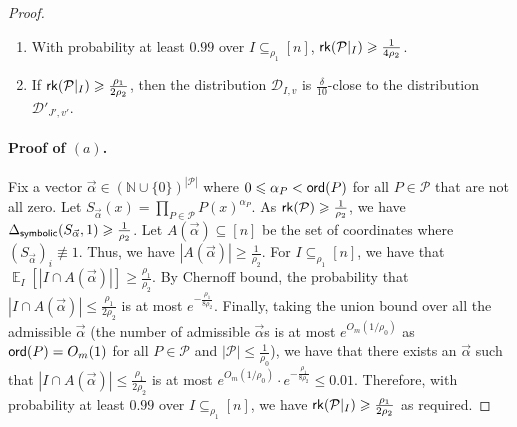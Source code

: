\documentclass[10pt,a4paper]{amsart}
\newcommand\Expect[2]{{\mathop{\mathbb{E}}_{#1}\left[ {#2} \right]}}
\renewcommand\geq{\geqslant}
\renewcommand\leq{\leqslant}
\begin{document}
\begin{proof}
\begin{enumerate}
    \item[(a)] With probability at least $0.99$ over $I\subseteq_{\rho_1} [n]$, ${\sf rk}(\mathcal{P}|_{I})\geq \frac{1}{4\rho_2}$.
    \item[(b)] If ${\sf rk}(\mathcal{P}|_{{I}})\geq \frac{\rho_1}{2\rho_2}$, then the distribution $\mathcal{D}_{I, v}$ is $\frac{\delta}{10}$-close to the distribution $\mathcal{D}'_{J', v'}$.
\end{enumerate}

\paragraph{Proof of $(a)$.} Fix a vector $\vec{\alpha}\in (\mathbb{N} \cup \{0\})^{|\mathcal{P}|}$ where $0\leq \alpha_P <{\sf ord}(P)$ for all $P\in \mathcal{P}$ that are not all zero. Let $S_{\vec{\alpha}}(x) = \prod_{P\in \mathcal{P}} P(x)^{\alpha_P}$. As ${\sf rk}(\mathcal{P}) \geq \frac{1}{\rho_2}$, we have $\Delta_{{\sf symbolic}}(S_{\vec{\alpha}},1)\geq \frac{1}{\rho_2}$. Let $A({\vec{\alpha}}) \subseteq [n]$ be the set of coordinates where $(S_{\vec{\alpha}})_i \not\equiv 1$. Thus, we have $|A({\vec{\alpha}})|\geq \frac{1}{\rho_2}$. For $I\subseteq_{\rho_1} [n]$, we have that $	\Expect{I}{|I\cap A({\vec{\alpha}})|} \geq \frac{\rho_1}{\rho_2}$. By Chernoff bound, the probability that $|I\cap A({\vec{\alpha}})| \leq \frac{\rho_1}{2\rho_2}$ is at most $e^{-\frac{\rho_1}{8\rho_2}}$. Finally, taking the union bound over all the admissible $\vec{\alpha}$ (the number of admissible $\vec{\alpha}$s is at most $e^{O_m(1/\rho_0)}$ as ${\sf ord}(P) = O_m(1)$ for all $P\in \mathcal{P}$ and $|\mathcal{P}|\leq \frac{1}{\rho_0}$), we have that there exists an $\vec{\alpha}$ such that $|I\cap A({\vec{\alpha}})| \leq \frac{\rho_1}{2\rho_2}$ is at most \hypertarget{setting1}{$e^{O_m(1/\rho_0)}\cdot e^{-\frac{\rho_1}{8\rho_2}}\leq 0.01$}. Therefore, with probability at least $0.99$ over $I\subseteq_{\rho_1} [n]$, we have ${\sf rk}(\mathcal{P}|_{I})\geq \frac{\rho_1}{2\rho_2}$ as required.

\end{proof}
\end{document}
